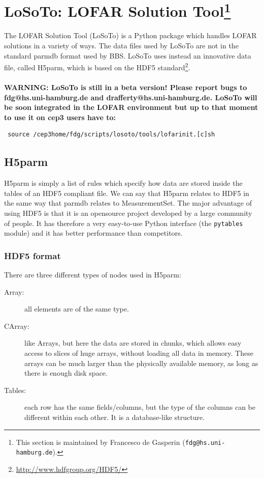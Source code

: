 \documentclass[]{article}
\begin{document}

\def \losoto {LoSoTo}

\section[LoSoTo: LOFAR Solution Tool]{\losoto: LOFAR Solution Tool\footnote{This section is maintained by Francesco de Gasperin ({\tt fdg@hs.uni-hamburg.de}).}}
\label{losoto}

The LOFAR Solution Tool (\losoto{}) is a Python package which handles LOFAR solutions in a variety of ways. The data files used by \losoto{} are not in the standard parmdb format used by BBS. \losoto{} uses instead an innovative data file, called H5parm, which is based on the HDF5 standard\footnote{\url{http://www.hdfgroup.org/HDF5/}}.
\\
\\
\textbf{WARNING: \losoto{} is still in a beta version! Please report bugs to fdg@hs.uni-hamburg.de and drafferty@hs.uni-hamburg.de. \losoto{} will be soon integrated in the LOFAR environment but up to that moment to use it on cep3 users have to:}
\begin{verbatim}
 source /cep3home/fdg/scripts/losoto/tools/lofarinit.[c]sh
\end{verbatim}

\subsection{H5parm}
\label{losoto:h5parm}

H5parm is simply a list of rules which specify how data are stored inside the tables of an HDF5 compliant file. We can say that H5parm relates to HDF5 in the same way that parmdb relates to MeasurementSet. The major advantage of using HDF5 is that it is an opensource project developed by a large community of people. It has therefore a very easy-to-use Python interface (the \texttt{pytables} module) and it has better performance than competitors.

\subsubsection{HDF5 format}
\label{losoto:HDF5}

There are three different types of nodes used in H5parm:
\begin{description}
 \item[Array:] all elements are of the same type.
 \item[CArray:] like Arrays, but here the data are stored in chunks, which allows easy access to
slices of huge arrays, without loading all data in memory. These arrays can be much
larger than the physically available memory, as long as there is enough disk space.
 \item[Tables:] each row has the same fields/columns, but the type of the columns can be different within each other. It is a database-like structure.
\end{description}
\end{document}
